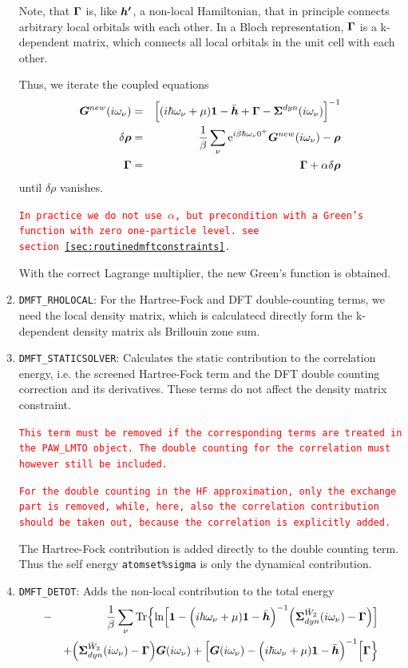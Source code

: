 \documentclass[11pt,a4paper]{report}
\newcommand{\petertt}[1]{\textcolor{red}{\texttt{#1}}}
\begin{document}
\begin{enumerate}
Note, that $\bm{\Gamma}$ is, like $\bm{h'}$, a non-local Hamiltonian,
that in principle connects arbitrary local orbitals with each
other. In a Bloch representation, $\bm{\Gamma}$ is a k-dependent matrix,
which connects all local orbitals in the unit cell with each other.

Thus, we iterate the coupled equations
\begin{eqnarray}
\bm{G}^{new}(i\omega_\nu)&=&\Bigl[(i\hbar\omega_\nu+\mu)\bm{1}
-\bar{\bm{h}}+\bm{\Gamma}
-\bm{\Sigma}^{dyn}(i\omega_\nu)
\Bigr]^{-1}
\nonumber\\
\delta\bm{\rho}&=&\frac{1}{\beta}\sum_\nu 
\mathrm{e}^{i\beta\hbar\omega_\nu0^+}\bm{G}^{new}(i\omega_\nu)-\bm{\rho}
\nonumber\\
\bm{\Gamma}&=&\bm{\Gamma}+\alpha \delta\bm{\rho}
\end{eqnarray}
until $\delta\rho$ vanishes.

\petertt{In practice we do not use $\alpha$, but precondition with a
  Green's function with zero one-particle level. see
  section~\ref{sec:routinedmftconstraints}.}

With the correct Lagrange multiplier, the new Green's function is
obtained.
%
\item \verb|DMFT_RHOLOCAL|: For the Hartree-Fock and DFT
  double-counting terms, we need the local density matrix, which is
  calculatecd directly form the k-dependent density matrix als
  Brillouin zone sum.
%
\item \verb|DMFT_STATICSOLVER|: Calculates the static contribution to
  the correlation energy, i.e. the screened Hartree-Fock term and the
  DFT double counting correction and its derivatives. These terms do
  not affect the density matrix constraint.

   \petertt{This term must be removed if the corresponding terms are
     treated in the PAW\_LMTO object. The double counting for the
     correlation must however still be included.}

    \petertt{For the double counting in the HF approximation, only the
      exchange part is removed, while, here, also the correlation
      contribution should be taken out, because the correlation is
      explicitly added.}

    The Hartree-Fock contribution is added directly to the double
  counting term. Thus the self energy \verb|atomset%sigma| is only
  the dynamical contribution.
%
\item \verb|DMFT_DETOT|: Adds the non-local contribution to the total energy
\begin{eqnarray}
&-&\frac{1}{\beta}\sum_\nu\mathrm{Tr}\Bigl\lbrace
\ln\Bigl[
\bm{1}-
\Bigl(i\hbar\omega_\nu+\mu)\bm{1}-\bar{\bm{h}}\Bigr)^{-1}
\Bigl(
\bm{\Sigma}^{\hat{W}_2}_{dyn}(i\omega_\nu)-\bm{\Gamma}\Bigr)
\Bigr]
\nonumber\\&&
+\Bigl(\bm{\Sigma}^{\hat{W}_2}_{dyn}(i\omega_\nu)
-\bm{\Gamma}\Bigr)\bm{G}(i\omega_\nu)
+
\Bigl[
\bm{G}(i\omega_\nu)
-\Bigl(i\hbar\omega_\nu+\mu)\bm{1}-\bar{\bm{h}}\Bigr)^{-1}
\Bigr[
\bm{\Gamma}\Bigr\rbrace
\end{eqnarray}


\end{enumerate}
\end{document}

